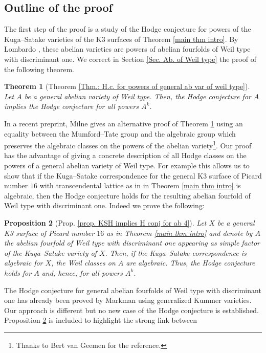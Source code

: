 \documentclass[11pt,twoside,a4paper]{amsart}
\newcommand{\0}{\mathscr{O}}
\theoremstyle{plain}
\newtheorem{thm}{Theorem}[section]
\newtheorem{prop}[thm]{Proposition}
\theoremstyle{definition}
\theoremstyle{remark}
\begin{document}
\subsection{Outline of the proof}
The first step of the proof is a study of the Hodge conjecture for powers of the Kuga--Satake varieties of the K3 surfaces of Theorem \ref{main thm intro}. By Lombardo \cite{lombardo01kugasatake}, these abelian varieties are powers of abelian fourfolds of Weil type with discriminant one. We correct in Section
\ref{Sec. Ab. of Weil type} the proof of the following theorem. \begin{thm}[Theorem \ref{Thm.: H.c. for powers of general ab var of weil type}]\cite{abdulali1999abelianIII}
\label{thm. abdulali intro}
Let $A$ be a general abelian variety of Weil type. Then, the Hodge conjecture for $A$ implies the Hodge conjecture for all powers $A^k$.
\end{thm}
In a recent preprint, Milne \cite{milne2021tate} gives an alternative proof of Theorem \ref{thm. abdulali intro} using an equality between the Mumford--Tate group and the algebraic group which preserves the algebraic classes on the powers of the abelian variety\footnote{Thanks to Bert van Geemen for the reference.}. Our proof has the advantage of giving a concrete description of all Hodge classes on the powers of a general abelian variety of Weil type. For example this allows us to show that if the Kuga--Satake correspondence for the general K3 surface of Picard number $16$ with transcendental lattice as in in Theorem \ref{main thm intro} is algebraic, then the Hodge conjecture holds for the resulting abelian fourfold of Weil type with discriminant one. Indeed we prove the following:
\begin{prop}[Prop. \ref{prop. KSH implies H conj for ab 4}]
\label{Prop: hodge conj for the resulting ab 4fold intro}
Let $X$ be a general K3 surface of Picard number $16$ as in Theorem \ref{main thm intro} and denote by $A$ the abelian fourfold of Weil type with discriminant one appearing as simple factor of the Kuga--Satake variety of $X$. Then, if the Kuga--Satake correspondence is algebraic for $X$, the Weil classes on $A$ are algebraic. Thus, the Hodge conjecture holds for $A$ and, hence, for all powers $A^k$.
\end{prop}
The Hodge conjecture for general abelian fourfolds of Weil type  with discriminant one
has already been proved by Markman \cite{markman2018monodromy} using generalized Kummer varieties. Our approach is different but
no new case of the Hodge conjecture is established. Proposition \ref{Prop: hodge conj for the resulting ab 4fold intro} is included to highlight the strong link between 
\end{document}
